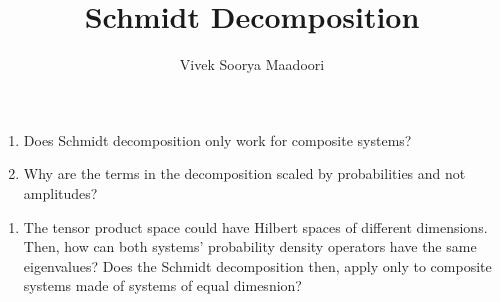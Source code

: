 \documentclass[a4paper,12pt]{amsbook}
\newcommand{\0}{{$|0\rangle$}}
\newcommand{\1}{{$|1\rangle$}}
\begin{document}
\author{Vivek Soorya Maadoori}
\title{Schmidt Decomposition}
\maketitle
\tableofcontents

\begin{enumerate}
    \item Does Schmidt decomposition only work for composite systems?
    \item Why are the terms in the decomposition scaled by probabilities and not amplitudes?
\end{enumerate}

\begin{enumerate}
    \item The tensor product space could have Hilbert spaces of different dimensions. Then, how can both systems' probability density operators  have the same eigenvalues? Does the Schmidt decomposition then, apply only to composite systems made of systems of equal dimesnion? 
\end{enumerate}
\end{document}
